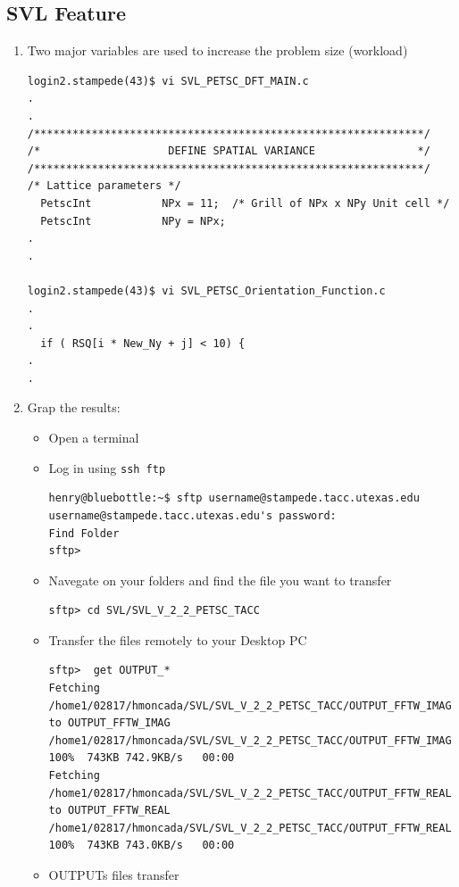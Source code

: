 \documentclass{article}
\begin{document}
\subsection{SVL Feature}
\begin{enumerate}
\item Two major variables are used to increase the problem size (workload)
\scriptsize
\begin{verbatim}
login2.stampede(43)$ vi SVL_PETSC_DFT_MAIN.c 
.
.
/*************************************************************/
/*                    DEFINE SPATIAL VARIANCE                */
/*************************************************************/
/* Lattice parameters */
  PetscInt           NPx = 11;  /* Grill of NPx x NPy Unit cell */
  PetscInt           NPy = NPx;
.
.

login2.stampede(43)$ vi SVL_PETSC_Orientation_Function.c 
.
.
  if ( RSQ[i * New_Ny + j] < 10) {
.
.
\end{verbatim}
\normalsize
\item Grap the results:
\begin{itemize}
\item Open a terminal
\item Log in using \verb+ssh ftp+
\scriptsize
\begin{verbatim}
henry@bluebottle:~$ sftp username@stampede.tacc.utexas.edu
username@stampede.tacc.utexas.edu's password:
Find Folder 
sftp>  
\end{verbatim}
\normalsize
\item Navegate on your folders and find the file you want to transfer
\scriptsize
\begin{verbatim}
sftp> cd SVL/SVL_V_2_2_PETSC_TACC 
\end{verbatim}
\normalsize
\item Transfer the files remotely to your Desktop PC
\scriptsize
\begin{verbatim}
sftp>  get OUTPUT_*
Fetching /home1/02817/hmoncada/SVL/SVL_V_2_2_PETSC_TACC/OUTPUT_FFTW_IMAG to OUTPUT_FFTW_IMAG
/home1/02817/hmoncada/SVL/SVL_V_2_2_PETSC_TACC/OUTPUT_FFTW_IMAG    100%  743KB 742.9KB/s   00:00    
Fetching /home1/02817/hmoncada/SVL/SVL_V_2_2_PETSC_TACC/OUTPUT_FFTW_REAL to OUTPUT_FFTW_REAL
/home1/02817/hmoncada/SVL/SVL_V_2_2_PETSC_TACC/OUTPUT_FFTW_REAL                                          100%  743KB 743.0KB/s   00:00    
\end{verbatim}
\normalsize
\item  OUTPUTs files transfer
\scriptsize
\begin{verbatim}

\end{verbatim}
\end{itemize}
\end{enumerate}
\end{document}
